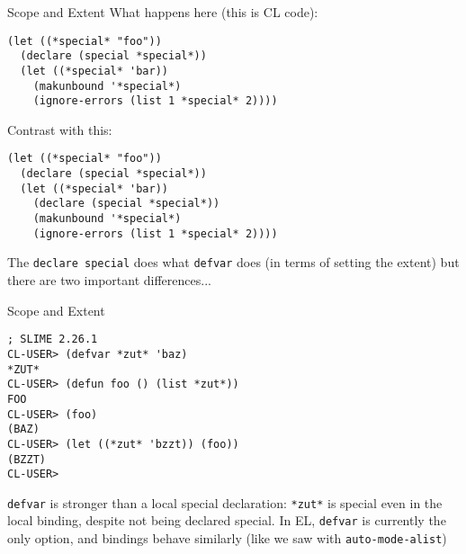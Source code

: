 \documentclass[presentation]{beamer}
\begin{document}
\begin{frame}[fragile]{Scope and Extent}
  What happens here (this is CL code):
\begin{verbatim}
(let ((*special* "foo"))
  (declare (special *special*))
  (let ((*special* 'bar))
    (makunbound '*special*)
    (ignore-errors (list 1 *special* 2))))
\end{verbatim}

Contrast with this:
\begin{verbatim}
(let ((*special* "foo"))
  (declare (special *special*))
  (let ((*special* 'bar))
    (declare (special *special*))
    (makunbound '*special*)
    (ignore-errors (list 1 *special* 2))))
\end{verbatim}

  The \texttt{declare special} does what \texttt{defvar} does (in terms of setting the extent) but there are two important differences...
\end{frame}

\begin{frame}[fragile]{Scope and Extent}
\begin{verbatim}
; SLIME 2.26.1
CL-USER> (defvar *zut* 'baz)
*ZUT*
CL-USER> (defun foo () (list *zut*))
FOO
CL-USER> (foo)
(BAZ)
CL-USER> (let ((*zut* 'bzzt)) (foo))
(BZZT)
CL-USER> 
\end{verbatim}

\texttt{defvar} is stronger than a local special declaration: \texttt{*zut*} is special even in the local binding, despite not being declared special.  In EL, \texttt{defvar} is currently the only option, and bindings behave similarly (like we saw with \texttt{auto-mode-alist})
\end{frame}
\end{document}
